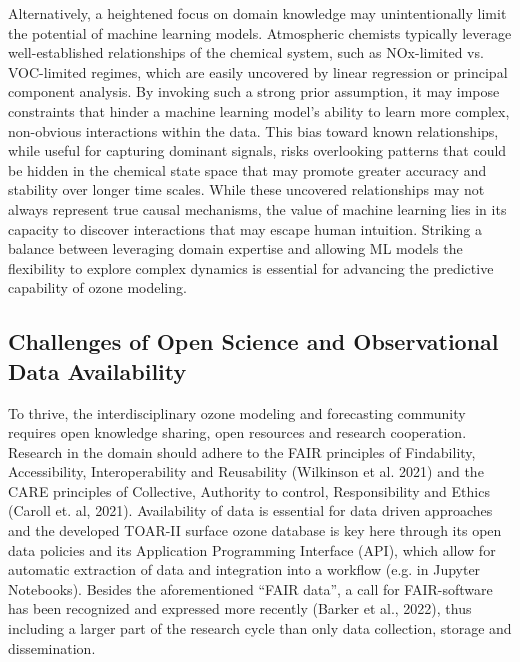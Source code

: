 \documentclass[gmd, manuscript]{copernicus}
\begin{document}
Alternatively, a heightened focus on domain knowledge may unintentionally limit the potential of machine learning models. Atmospheric chemists typically leverage well-established relationships of the chemical system, such as NOx-limited vs. VOC-limited regimes, which are easily uncovered by linear regression or principal component analysis. By invoking such a strong prior assumption, it may impose constraints that hinder a machine learning model's ability to learn more complex, non-obvious interactions within the data. This bias toward known relationships, while useful for capturing dominant signals, risks overlooking patterns that could be hidden in the chemical state space that may promote greater accuracy and stability over longer time scales. While these uncovered relationships may not always represent true causal mechanisms, the value of machine learning lies in its capacity to discover interactions that may escape human intuition. Striking a balance between leveraging domain expertise and allowing ML models the flexibility to explore complex dynamics is essential for advancing the predictive capability of ozone modeling.


\subsection{Challenges of Open Science and Observational Data Availability}

To thrive, the interdisciplinary ozone modeling and forecasting community requires open knowledge sharing, open resources and research cooperation. Research in the domain should adhere to the FAIR principles of Findability, Accessibility, Interoperability and Reusability (Wilkinson et al. 2021) and the CARE principles of Collective, Authority to control, Responsibility and Ethics (Caroll et. al, 2021). Availability of data is essential for data driven approaches and the developed TOAR-II surface ozone database is key here through its open data policies and its Application Programming Interface (API), which allow  for automatic extraction of data and integration into a workflow (e.g. in Jupyter Notebooks). Besides the aforementioned “FAIR data”, a call for FAIR-software has been recognized and expressed more recently (Barker et al., 2022), thus including a larger part of the research cycle than only data collection, storage and dissemination.
\end{document}

